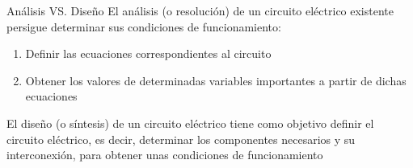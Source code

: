 \documentclass[aspectratio=169, xcolor={usenames,svgnames,dvipsnames}]{beamer}
\begin{document}
\begin{frame}{Análisis VS. Diseño}
El \alert{análisis} (o resolución) de un circuito eléctrico existente persigue determinar sus condiciones de funcionamiento:
\begin{enumerate}
\item Definir las ecuaciones correspondientes al circuito
\item Obtener los valores de determinadas variables importantes a partir de dichas ecuaciones
\end{enumerate}

El \alert{diseño} (o síntesis) de un circuito eléctrico tiene como objetivo definir el circuito eléctrico, es decir, determinar los componentes necesarios y su interconexión, para obtener unas condiciones de funcionamiento
\end{frame}




\end{document}
